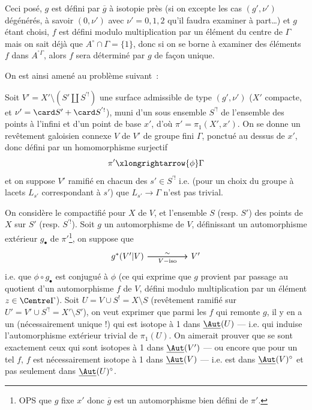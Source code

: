 Ceci posé, $g$ est défini par $\overline{g}$ à isotopie près (si on excepte les cas $(g', \nu')$ dégénérés, à savoir $(0, \nu')$ avec $\nu' = 0, 1, 2$ qu'il faudra examiner à part\dots) et $g$ étant choisi, $f$ est défini modulo multiplication par un élément du centre de $\Gamma$ mais on sait déjà que $A^\circ \cap \Gamma = \{ 1 \}$, donc si on se borne à examiner des éléments $f$ dans $A^{^\circ \Gamma}$, alors $f$ sera déterminé par $g$ de fa\c{c}on unique.
 
On est ainsi amené au problème suivant~:

Soit $V' = X' \setminus (S' \amalg S^{'!})$ une surface admissible de type $(g', \nu')$ ($X'$ compacte, et $\nu' = \card S' + \card S^{'!}$), muni d'un sous ensemble $S^{'!}$ de l'ensemble des points à l'infini et d'un point de base $x'$, d'où $\pi' = \pi_1 (X', x')$. On se donne un revêtement galoisien connexe $V$ de $V'$ de groupe fini $\Gamma$, ponctué au dessus de $x'$, donc défini par un homomorphisme surjectif
$$
\pi' \xlongrightarrow{\phi} \Gamma
$$
et on suppose $V'$ ramifié en chacun des $s' \in S^{'!}$ i.e. (pour un choix du groupe à lacets $L_{s'}$ correspondant à $s'$) que $L_{s'} \to \Gamma$ n'est pas trivial. 

On considère le compactifié pour $X$ de $V$, et l'ensemble $S$ (resp. $S'$) des points de $X$ sur $S'$ (resp. $S^{'!}$). Soit $g$ un automorphisme de $V$, définissant un automorphisme extérieur $g_\bullet$ de $\pi'$\footnote{OPS que $g$ fixe $x'$ donc $\overline{g}$ est un automorphisme bien défini de $\pi'$.}, on suppose que 
\[\begin{tikzcd}
	{g^*(V'|{V})} && {V'}
	\arrow["\sim", from=1-1, to=1-3]
	\arrow["{V-\text{iso}}"', from=1-1, to=1-3]
\end{tikzcd}\]
i.e. que $\phi \circ g_\bullet$ est conjugué à $\phi$ (ce qui exprime que $g$ provient par passage au quotient d'un automorphisme $f$ de $V$, défini modulo multiplication par un élément $z \in \Centre \Gamma$). Soit $U = V \cup S^! = X \setminus S$ (revêtement ramifié sur $U' = V' \cup S^{'!} = X' \setminus S'$), on veut exprimer que parmi les $f$ qui remonte $g$, il y en a un (nécessairement unique !) qui est isotope à 1 dans $\underline{\Aut}(U)$ --- i.e. qui induise l'automorphisme extérieur trivial de $\pi_1(U)$. On aimerait prouver que se sont exactement ceux qui sont isotopes à 1 dans $\underline{\Aut}(V')$ --- ou encore que pour un tel $f$, $f$ est nécessairement isotope à 1 dans $\underline{\Aut} (V)$ --- i.e. est dans $\underline{\Aut} (V)^\circ$ et pas seulement dans $\underline{\Aut} (U)^\circ$.


